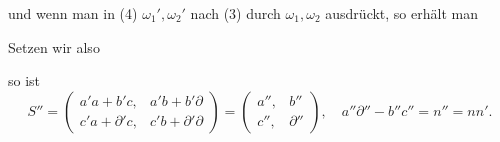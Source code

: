und wenn man in (4) $\omega_1', \omega_2'$ nach (3) durch $\omega_1, \omega_2$ ausdrückt, so erhält man


Setzen wir also


so ist
\[
S'' = \begin{pmatrix} a'a+b'c, & a'b+b'\partial \\ c'a+\partial'c, & c'b+\partial'\partial \end{pmatrix} = \begin{pmatrix} a'', & b'' \\ c'', & \partial'' \end{pmatrix}, \quad a''\partial'' - b''c'' = n'' = nn'.
\]
